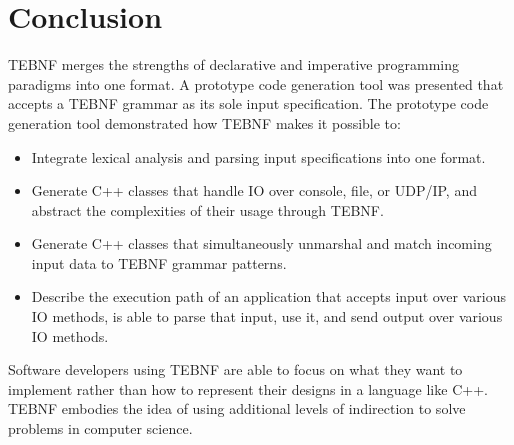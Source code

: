 \chapter{Conclusion}
TEBNF merges the strengths of declarative and imperative programming paradigms into one format.  A prototype code generation tool was presented that accepts a TEBNF grammar as its sole input specification.  The prototype code generation tool demonstrated how TEBNF makes it possible to:
\begin{itemize}
  \item Integrate lexical analysis and parsing input specifications into one format.
  \item Generate C++ classes that handle IO over console, file, or UDP/IP, and abstract the complexities of their usage through TEBNF.
  \item Generate C++ classes that simultaneously unmarshal and match incoming input data to TEBNF grammar patterns.
  \item Describe the execution path of an application that accepts input over various IO methods, is able to parse that input, use it, and send output over various IO methods.
\end{itemize}

\indent
Software developers using TEBNF are able to focus on what they want to implement rather than how to represent their designs in a language like C++.  TEBNF embodies the idea of using additional levels of indirection to solve problems in computer science.

